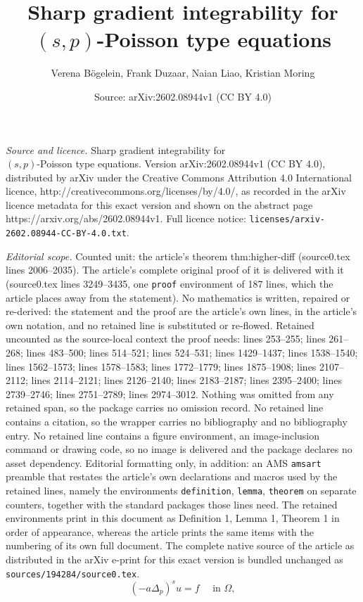 \documentclass[10pt,a4paper]{amsart}
\title{Sharp gradient integrability for\\ $(s,p)$-Poisson type equations}
\author{Verena B\"ogelein, Frank Duzaar, Naian Liao, Kristian Moring}
\date{Source: arXiv:2602.08944v1 (CC BY 4.0)}
\begin{document}
\maketitle

\noindent\emph{Source and licence.} Sharp gradient integrability for\\ $(s,p)$-Poisson type equations. Version arXiv:2602.08944v1 (CC BY 4.0), distributed by arXiv under the Creative Commons Attribution 4.0 International licence, http://creativecommons.org/licenses/by/4.0/, as recorded in the arXiv licence metadata for this exact version and shown on the abstract page https://arxiv.org/abs/2602.08944v1. Full licence notice: \texttt{licenses/arxiv-2602.08944-CC-BY-4.0.txt}.\par\smallskip

\noindent\textit{Editorial scope.} Counted unit: the article's theorem thm:higher-diff (source0.tex lines 2006--2035). The article's complete original proof of it is delivered with it (source0.tex lines 3249--3435, one \texttt{proof} environment of 187 lines, which the article places away from the statement). No mathematics is written, repaired or re-derived: the statement and the proof are the article's own lines, in the article's own notation, and no retained line is substituted or re-flowed.  Retained uncounted as the source-local context the proof needs: lines 253--255; lines 261--268; lines 483--500; lines 514--521; lines 524--531; lines 1429--1437; lines 1538--1540; lines 1562--1573; lines 1578--1583; lines 1772--1779; lines 1875--1908; lines 2107--2112; lines 2114--2121; lines 2126--2140; lines 2183--2187; lines 2395--2400; lines 2739--2746; lines 2751--2789; lines 2974--3012.  Nothing was omitted from any retained span, so the package carries no omission record.  No retained line contains a citation, so the wrapper carries no bibliography and no bibliography entry.  No retained line contains a figure environment, an image-inclusion command or drawing code, so no image is delivered and the package declares no asset dependency.  Editorial formatting only, in addition: an AMS \texttt{amsart} preamble that restates the article's own declarations and macros used by the retained lines, namely the environments \texttt{definition}, \texttt{lemma}, \texttt{theorem} on separate counters, together with the standard packages those lines need.  The retained environments print in this document as Definition 1, Lemma 1, Theorem 1 in order of appearance, whereas the article prints the same items with the numbering of its own full document.  The complete native source of the article as distributed in the arXiv e-print for this exact version is bundled unchanged as \texttt{sources/194284/source0.tex}.
\begin{equation} \label{eq:frac-p-lap}
\left( - a \Delta_p\right)^s u = f \quad \text{ in } \Omega,
\end{equation}
\end{document}
